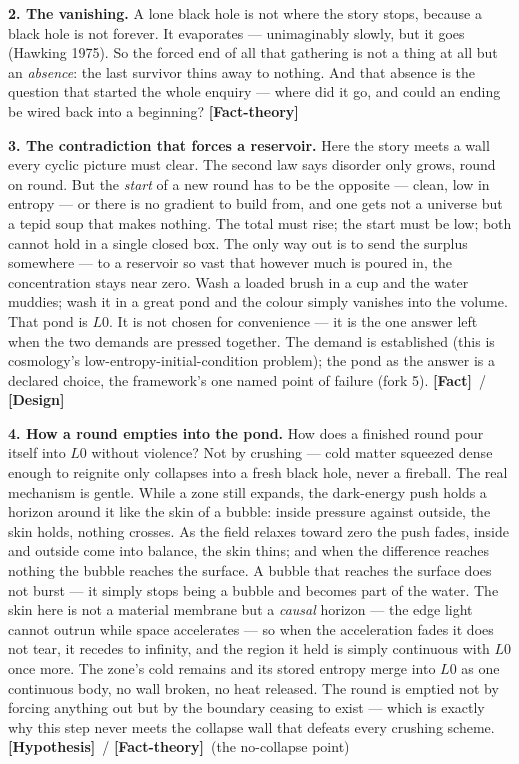 \documentclass[11pt]{article}
\newcommand{\Fact}{\textbf{\textcolor{green!45!black}{[Fact]}}}
\newcommand{\Hyp}{\textbf{\textcolor{blue!55!black}{[Hypothesis]}}}
\newcommand{\Design}{\textbf{\textcolor{purple!65!black}{[Design]}}}
\newcommand{\factth}{\textcolor{green!40!black}{\textbf{[Fact-theory]}}}
\begin{document}
\noindent\textbf{2. The vanishing.} A lone black hole is not where the story stops, because a black hole is not forever. It evaporates --- unimaginably slowly, but it goes (Hawking 1975). So the forced end of all that gathering is not a thing at all but an \emph{absence}: the last survivor thins away to nothing. And that absence is the question that started the whole enquiry --- where did it go, and could an ending be wired back into a beginning? \factth

\noindent\textbf{3. The contradiction that forces a reservoir.} Here the story meets a wall every cyclic picture must clear. The second law says disorder only grows, round on round. But the \emph{start} of a new round has to be the opposite --- clean, low in entropy --- or there is no gradient to build from, and one gets not a universe but a tepid soup that makes nothing. The total must rise; the start must be low; both cannot hold in a single closed box. The only way out is to send the surplus somewhere --- to a reservoir so vast that however much is poured in, the concentration stays near zero. Wash a loaded brush in a cup and the water muddies; wash it in a great pond and the colour simply vanishes into the volume. That pond is $L0$. It is not chosen for convenience --- it is the one answer left when the two demands are pressed together. The demand is established (this is cosmology's low-entropy-initial-condition problem); the pond as the answer is a declared choice, the framework's one named point of failure (fork 5). \Fact\ / \Design

\noindent\textbf{4. How a round empties into the pond.} How does a finished round pour itself into $L0$ without violence? Not by crushing --- cold matter squeezed dense enough to reignite only collapses into a fresh black hole, never a fireball. The real mechanism is gentle. While a zone still expands, the dark-energy push holds a horizon around it like the skin of a bubble: inside pressure against outside, the skin holds, nothing crosses. As the field relaxes toward zero the push fades, inside and outside come into balance, the skin thins; and when the difference reaches nothing the bubble reaches the surface. A bubble that reaches the surface does not burst --- it simply stops being a bubble and becomes part of the water. The skin here is not a material membrane but a \emph{causal} horizon --- the edge light cannot outrun while space accelerates --- so when the acceleration fades it does not tear, it recedes to infinity, and the region it held is simply continuous with $L0$ once more. The zone's cold remains and its stored entropy merge into $L0$ as one continuous body, no wall broken, no heat released. The round is emptied not by forcing anything out but by the boundary ceasing to exist --- which is exactly why this step never meets the collapse wall that defeats every crushing scheme. \Hyp\ / \factth\ (the no-collapse point)
\end{document}
